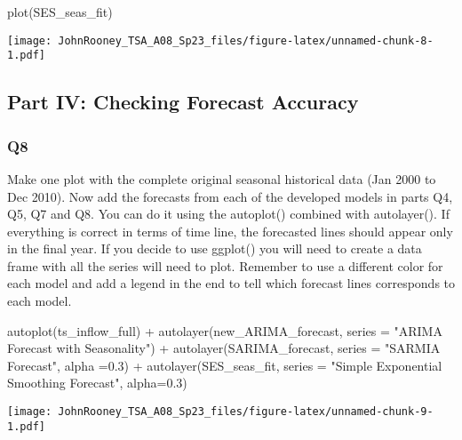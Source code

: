 \documentclass[
]{article}
\newenvironment{Shaded}{\begin{snugshade}}{\end{snugshade}}
\newcommand{\AttributeTok}[1]{\textcolor[rgb]{0.77,0.63,0.00}{#1}}
\newcommand{\FloatTok}[1]{\textcolor[rgb]{0.00,0.00,0.81}{#1}}
\newcommand{\FunctionTok}[1]{\textcolor[rgb]{0.00,0.00,0.00}{#1}}
\newcommand{\NormalTok}[1]{#1}
\newcommand{\SpecialCharTok}[1]{\textcolor[rgb]{0.00,0.00,0.00}{#1}}
\newcommand{\StringTok}[1]{\textcolor[rgb]{0.31,0.60,0.02}{#1}}
\begin{document}
\begin{Shaded}
\begin{Highlighting}[]
\FunctionTok{plot}\NormalTok{(SES\_seas\_fit)}
\end{Highlighting}
\end{Shaded}

\texttt{[image: JohnRooney\_TSA\_A08\_Sp23\_files/figure-latex/unnamed-chunk-8-1.pdf]}

\hypertarget{part-iv-checking-forecast-accuracy}{%
\subsection{Part IV: Checking Forecast
Accuracy}\label{part-iv-checking-forecast-accuracy}}

\hypertarget{q8}{%
\subsubsection{Q8}\label{q8}}

Make one plot with the complete original seasonal historical data (Jan
2000 to Dec 2010). Now add the forecasts from each of the developed
models in parts Q4, Q5, Q7 and Q8. You can do it using the autoplot()
combined with autolayer(). If everything is correct in terms of time
line, the forecasted lines should appear only in the final year. If you
decide to use ggplot() you will need to create a data frame with all the
series will need to plot. Remember to use a different color for each
model and add a legend in the end to tell which forecast lines
corresponds to each model.

\begin{Shaded}
\begin{Highlighting}[]
\FunctionTok{autoplot}\NormalTok{(ts\_inflow\_full) }\SpecialCharTok{+}
  \FunctionTok{autolayer}\NormalTok{(new\_ARIMA\_forecast, }\AttributeTok{series =} \StringTok{"ARIMA Forecast with Seasonality"}\NormalTok{) }\SpecialCharTok{+}
  \FunctionTok{autolayer}\NormalTok{(SARIMA\_forecast, }\AttributeTok{series =} \StringTok{"SARMIA Forecast"}\NormalTok{, }\AttributeTok{alpha =}\FloatTok{0.3}\NormalTok{) }\SpecialCharTok{+}
  \FunctionTok{autolayer}\NormalTok{(SES\_seas\_fit, }\AttributeTok{series =} \StringTok{"Simple Exponential Smoothing Forecast"}\NormalTok{, }\AttributeTok{alpha=}\FloatTok{0.3}\NormalTok{)}
\end{Highlighting}
\end{Shaded}

\texttt{[image: JohnRooney\_TSA\_A08\_Sp23\_files/figure-latex/unnamed-chunk-9-1.pdf]}
\end{document}
